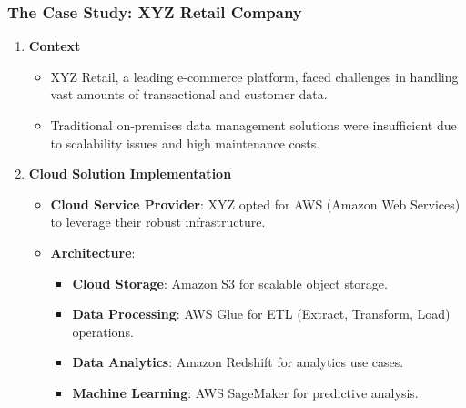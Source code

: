 \documentclass[aspectratio=169]{beamer}
\begin{document}
\begin{frame}[fragile]
    \frametitle{The Case Study: XYZ Retail Company}
    \begin{enumerate}
        \item \textbf{Context}
        \begin{itemize}
            \item XYZ Retail, a leading e-commerce platform, faced challenges in handling vast amounts of transactional and customer data.
            \item Traditional on-premises data management solutions were insufficient due to scalability issues and high maintenance costs.
        \end{itemize}

        \item \textbf{Cloud Solution Implementation}
        \begin{itemize}
            \item \textbf{Cloud Service Provider}: XYZ opted for AWS (Amazon Web Services) to leverage their robust infrastructure.
            \item \textbf{Architecture}:
            \begin{itemize}
                \item \textbf{Cloud Storage}: Amazon S3 for scalable object storage.
                \item \textbf{Data Processing}: AWS Glue for ETL (Extract, Transform, Load) operations.
                \item \textbf{Data Analytics}: Amazon Redshift for analytics use cases.
                \item \textbf{Machine Learning}: AWS SageMaker for predictive analysis.
            \end{itemize}
        \end{itemize}
    \end{enumerate}
\end{frame}
\end{document}
